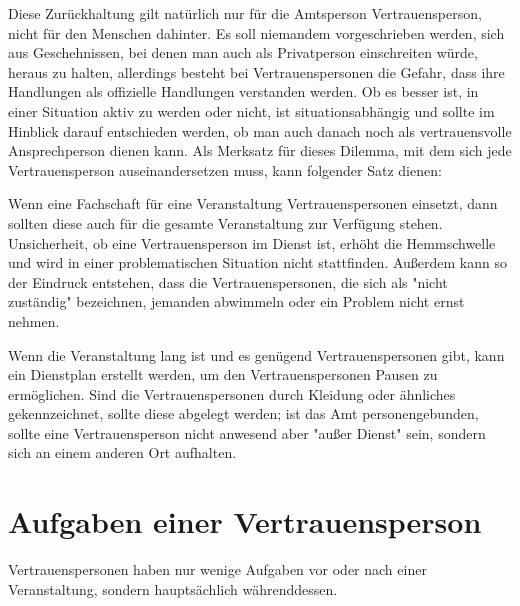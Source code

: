 \documentclass[DIV=calc]{scrartcl}
\begin{document}
Diese Zurückhaltung gilt natürlich nur für die Amtsperson Vertrauensperson, nicht für den Menschen dahinter. Es soll niemandem vorgeschrieben werden, sich aus Geschehnissen, bei denen man auch als Privatperson einschreiten würde, heraus zu halten, allerdings besteht bei Vertrauenspersonen die Gefahr, dass ihre Handlungen als offizielle Handlungen verstanden werden. 
Ob es besser ist, in einer Situation aktiv zu werden oder nicht, ist situationsabhängig und sollte im Hinblick darauf entschieden werden, ob man auch danach noch als vertrauensvolle Ansprechperson dienen kann. Als Merksatz für dieses Dilemma, mit dem sich jede Vertrauensperson auseinandersetzen muss, kann folgender Satz dienen:
\begin{center}
\end{center}

Wenn eine Fachschaft für eine Veranstaltung Vertrauenspersonen einsetzt, dann sollten diese auch für die gesamte Veranstaltung zur Verfügung stehen.
Unsicherheit, ob eine Vertrauensperson im Dienst ist, erhöht die Hemmschwelle und wird in einer problematischen Situation nicht stattfinden. Außerdem kann so der Eindruck entstehen, dass die Vertrauenspersonen, die sich als "nicht zuständig" bezeichnen, jemanden abwimmeln oder ein Problem nicht ernst nehmen.

Wenn die Veranstaltung lang ist und es genügend Vertrauenspersonen gibt,  kann ein Dienstplan erstellt werden, um den Vertrauenspersonen Pausen zu ermöglichen. Sind die Vertrauenspersonen durch Kleidung oder ähnliches gekennzeichnet, sollte diese abgelegt werden; ist das Amt personengebunden, sollte eine Vertrauensperson nicht anwesend aber "außer Dienst" sein, sondern sich an einem anderen Ort aufhalten.


\section{Aufgaben einer Vertrauensperson}

Vertrauenspersonen haben nur wenige Aufgaben vor oder nach einer Veranstaltung, sondern hauptsächlich währenddessen.
\end{document}
